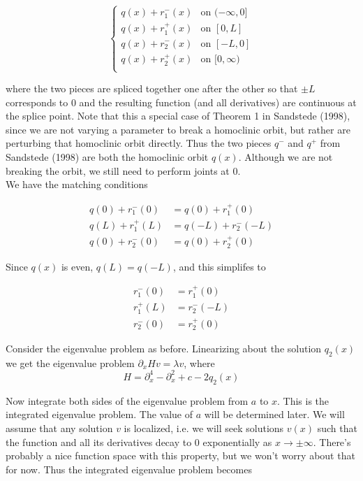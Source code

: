 \documentclass[12pt]{article}
\begin{document}
\begin{equation}\label{q2piecewise}
\begin{cases}
q(x) + r_1^-(x) & \text{on } (-\infty, 0] \\
q(x) + r_1^+(x) & \text{on } [0, L] \\
q(x) + r_2^-(x) & \text{on } [-L, 0] \\
q(x) + r_2^+(x) & \text{on } [0, \infty) \\ 
\end{cases}
\end{equation}

where the two pieces are spliced together one after the other so that $\pm L$ corresponds to 0 and the resulting function (and all derivatives) are continuous at the splice point. Note that this a special case of Theorem 1 in Sandstede (1998), since we are not varying a parameter to break a homoclinic orbit, but rather are perturbing that homoclinic orbit directly. Thus the two pieces $q^-$ and $q^+$ from Sandstede (1998) are both the homoclinic orbit $q(x)$. Although we are not breaking the orbit, we still need to perform joints at 0.
\\

We have the matching conditions

\begin{align*}
q(0) + r_1^-(0) &= q(0) + r_1^+(0) \\
q(L) + r_1^+(L) &= q(-L) + r_2^-(-L) \\
q(0) + r_2^-(0) &= q(0) + r_2^+(0)
\end{align*}

Since $q(x)$ is even, $q(L) = q(-L)$, and this simplifes to

\begin{align}\label{q2match}
r_1^-(0) &= r_1^+(0) \\
r_1^+(L) &= r_2^-(-L) \\
r_2^-(0) &= r_2^+(0)
\end{align}


Consider the eigenvalue problem as before. Linearizing about the solution $q_2(x)$ we get the eigenvalue problem $\partial_x H v = \lambda v$, where 
\begin{equation}\label{hamiltonian}
H = \partial_x^4 - \partial_x^2 + c - 2 q_2(x)
\end{equation}

Now integrate both sides of the eigenvalue problem from $a$ to $x$. This is the integrated eigenvalue problem. The value of $a$ will be determined later. We will assume that any solution $v$ is localized, i.e. we will seek solutions $v(x)$ such that the function and all its derivatives decay to 0 exponentially as $x \rightarrow \pm \infty$. There's probably a nice function space with this property, but we won't worry about that for now. Thus the integrated eigenvalue problem becomes
\end{document}
